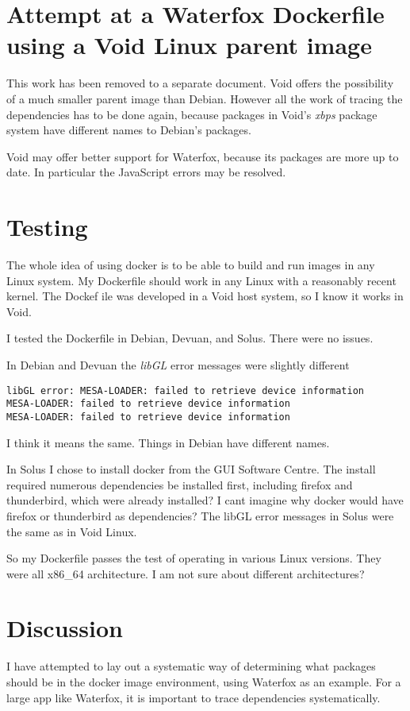 \documentclass[a4paper]{article}  %
\begin{document}
\section{Attempt at a Waterfox Dockerfile using a Void Linux parent image}
This work has been removed to a separate document. Void offers the possibility of a much smaller parent image than Debian. However all the work of tracing the dependencies has to be done again, because packages in Void's {\em xbps} package system have different names to Debian's packages.

Void may offer better support for Waterfox, because its packages are more up to date. In particular the JavaScript errors may be resolved. 

\section{Testing}
The whole idea of using docker is to be able to build and run images in any Linux system. My Dockerfile should work in any Linux with a reasonably recent kernel. The Dockef ile was developed in a Void host system, so I know it works in Void.

I tested the Dockerfile in Debian, Devuan, and Solus. There were no issues.

In Debian and Devuan the {\em libGL} error messages were slightly different
\begin{tcolorbox}
\begin{verbatim}
libGL error: MESA-LOADER: failed to retrieve device information
MESA-LOADER: failed to retrieve device information
MESA-LOADER: failed to retrieve device information
\end{verbatim}
\end{tcolorbox}
I think it means the same. Things in Debian have different names.

In Solus I chose to install docker from the GUI Software Centre. The install required numerous dependencies be installed first, including firefox and thunderbird, which were already installed?  I cant imagine why docker would have firefox or thunderbird as dependencies?  The libGL error messages in Solus were the same as in Void Linux. 

So my Dockerfile passes the test of operating in various Linux versions. They were all x86\_64 architecture. I am not sure about different architectures?

\section{Discussion}
I have attempted to lay out a systematic way of determining what packages should be in the docker image environment, using Waterfox as an example. For a large app like Waterfox, it is important to trace dependencies systematically. 
\end{document}
